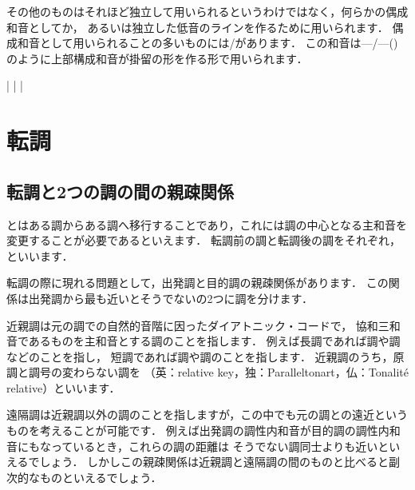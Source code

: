 \documentclass[dvipdfmx,uplatex,b5paper,openany,jbase=12Q,nomag*,textwidth-limit=44%
               ]{gachimuchi}[2020/05/05]
\begin{document}
その他のものはそれほど独立して用いられるというわけではなく，何らかの偶成和音としてか，
あるいは独立した低音のラインを作るために用いられます．
偶成和音として用いられることの多いものには\Gnv{}/\Gni があります．
この和音は\Gnv{}---\Gnv{}/\Gni---\Gni(\Min)のように上部構成和音が掛留の形を作る形で用いられます．
\begin{Music}[0.5\linewidth]
  \generalmeter{\allabreve}%
  \Startpiece
  \NOTes%
  |\hp%
  \en\bar
  \NOTes%
  |%
  \en\setdoublebar
  \endpiece
\end{Music}

\chapter{転調}
\section{転調と2つの調の間の親疎関係}
とはある調からある調へ移行することであり，これには調の中心となる主和音を変更することが必要であるといえます．
転調前の調と転調後の調をそれぞれ，といいます．

転調の際に現れる問題として，出発調と目的調の親疎関係があります．
この関係は出発調から最も近いとそうでないの2つに調を分けます．

近親調は元の調での自然的音階に因ったダイアトニック・コードで，
協和三和音であるものを主和音とする調のことを指します．
例えば長調であれば\Gnii\Min 調や\Gniv 調などのことを指し，
短調であれば\bFlat\Gniii 調や\Gnv\Min 調のことを指します．
近親調のうち，原調と調号の変わらない調を
（英：relative key，独：Paralleltonart，仏：Tonalité relative）といいます．

遠隔調は近親調以外の調のことを指しますが，この中でも元の調との遠近というものを考えることが可能です．
例えば出発調の調性内和音が目的調の調性内和音にもなっているとき，これらの調の距離は
そうでない調同士よりも近いといえるでしょう．
しかしこの親疎関係は近親調と遠隔調の間のものと比べると副次的なものといえるでしょう．
\end{document}
